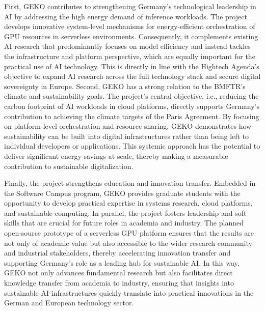 First, GEKO contributes to strengthening Germany's technological leadership in AI by addressing the high energy demand of inference workloads.
The project develops innovative system-level mechanisms for energy-efficient orchestration of GPU resources in serverless environments.
Consequently, it complements existing AI research that predominantly focuses on model efficiency and instead tackles the infrastructure and platform perspective, which are equally important for the practical use of AI technology.
This is directly in line with the Hightech Agenda's objective to expand AI research across the full technology stack and secure digital sovereignty in Europe.
Second, GEKO has a strong relation to the BMFTR's climate and sustainability goals.
The project's central objective, i.e., reducing the carbon footprint of AI workloads in cloud platforms, directly supports Germany's contribution to achieving the climate targets of the Paris Agreement.
By focusing on platform-level orchestration and resource sharing, GEKO demonstrates how sustainability can be built into digital infrastructures rather than being left to individual developers or applications.
This systemic approach has the potential to deliver significant energy savings at scale, thereby making a measurable contribution to sustainable digitalization.

Finally, the project strengthens education and innovation transfer.
Embedded in the Software Campus program, GEKO provides graduate students with the opportunity to develop practical expertise in systems research, cloud platforms, and sustainable computing.
In parallel, the project fosters leadership and soft skills that are crucial for future roles in academia and industry.
The planned open-source prototype of a serverless GPU platform ensures that the results are not only of academic value but also accessible to the wider research community and industrial stakeholders, thereby accelerating innovation transfer and supporting Germany's role as a leading hub for sustainable AI.
In this way, GEKO not only advances fundamental research but also facilitates direct knowledge transfer from academia to industry, ensuring that insights into sustainable AI infrastructures quickly translate into practical innovations in the German and European technology sector.